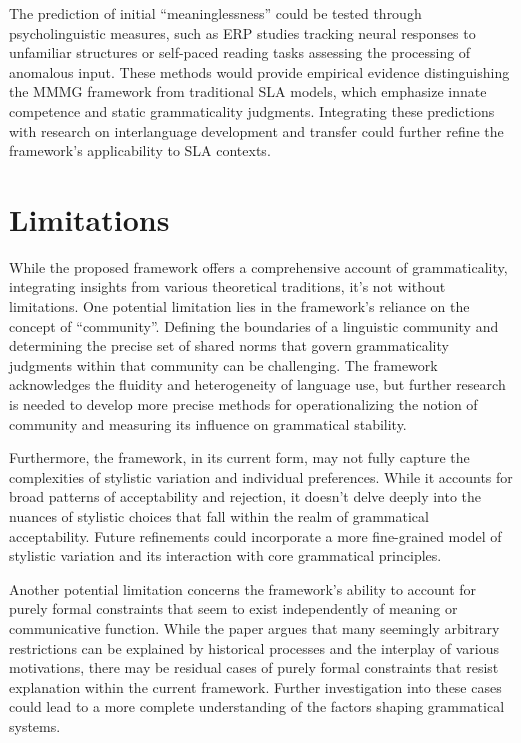 \documentclass[12pt,letterpaper]{article}
\begin{document}
The prediction of initial ``meaninglessness'' could be tested through psycholinguistic measures, such as ERP studies tracking neural responses to unfamiliar structures or self-paced reading tasks assessing the processing of anomalous input. These methods would provide empirical evidence distinguishing the MMMG framework from traditional SLA models, which emphasize innate competence and static grammaticality judgments. Integrating these predictions with research on interlanguage development and transfer could further refine the framework’s applicability to SLA contexts.

\section{Limitations}\label{sec:limitations}

While the proposed framework offers a comprehensive account of grammaticality, integrating insights from various theoretical traditions, it's not without limitations. One potential limitation lies in the framework's reliance on the concept of ``community''. Defining the boundaries of a linguistic community and determining the precise set of shared norms that govern grammaticality judgments within that community can be challenging. The framework acknowledges the fluidity and heterogeneity of language use, but further research is needed to develop more precise methods for operationalizing the notion of community and measuring its influence on grammatical stability.

Furthermore, the framework, in its current form, may not fully capture the complexities of stylistic variation and individual preferences. While it accounts for broad patterns of acceptability and rejection, it doesn't delve deeply into the nuances of stylistic choices that fall within the realm of grammatical acceptability. Future refinements could incorporate a more fine-grained model of stylistic variation and its interaction with core grammatical principles.

Another potential limitation concerns the framework's ability to account for purely formal constraints that seem to exist independently of meaning or communicative function. While the paper argues that many seemingly arbitrary restrictions can be explained by historical processes and the interplay of various motivations, there may be residual cases of purely formal constraints that resist explanation within the current framework. Further investigation into these cases could lead to a more complete understanding of the factors shaping grammatical systems.
\end{document}
